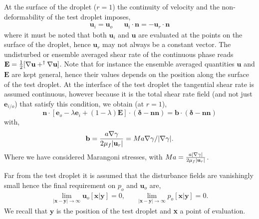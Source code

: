 At the surface of the droplet ($r = 1$) the continuity of velocity and the non-deformability of the test droplet imposes, 
\begin{align}
    \textbf{u}_{i} = \textbf{u}_{o}
    && 
    \textbf{u}_{i} \cdot \textbf{n}
    =
    - \textbf{u}_r \cdot \textbf{n}
    \label{eq:normal_vel}
\end{align}
where it must be noted that both $\textbf{u}_{i}$ and $\textbf{u}$ are evaluated at the points on the surface of the droplet, hence $\textbf{u}_r$ may not always be a constant vector. 
The undisturbed or ensemble averaged shear rate of the continuous phase reads  $\textbf{E} =\frac{1}{2} [\mathbf{\nabla} \textbf{u} + ^\dagger \mathbf{\nabla} \textbf{u}]$. 
Note that for instance the ensemble averaged quantities $\textbf{u}$ and $\textbf{E}$ are kept general, hence their values depends on the position along the surface of the test droplet. 
At the interface of the test droplet the tangential shear rate is assumed continuous, however because it is the total shear rate field (and not just $\textbf{e}_{i/o}$) that satisfy this condition, we obtain (at $r=1$),
\begin{equation}
    \mathbf{n}\cdot [\textbf{e}_{o} - \lambda \textbf{e}_{i} + (1-\lambda)\textbf{E}
    ]\cdot (\bm\delta - \textbf{nn})
    =
    \textbf{b}\cdot (\bm\delta - \textbf{nn})
    \label{eq:boundary_cdt_stress}
\end{equation}
with, 
\begin{equation}
    \textbf{b}
    =
    \frac{a \mathbf{\nabla} \gamma}{2 \mu_f |\textbf{u}_r|}
    = Ma \mathbf{\nabla}\gamma /|\mathbf{\nabla} \gamma|. 
\end{equation}
Where we have considered Marangoni stresses, with $Ma = \frac{a |\mathbf{\nabla} \gamma|}{2 \mu_f |\textbf{u}_r|}$. 



Far from the test droplet it is assumed that the disturbance fields are vanishingly small hence the final requirement on $p_{o}$ and $\textbf{u}_{o}$ are, 
\begin{align*}
    \lim_{|\textbf{x}-\textbf{y}|\to\infty }\textbf{u}_{o}[\textbf{x}|\textbf{y}] = 0,
    && \lim_{|\textbf{x}-\textbf{y}|\to\infty }p_{o}[\textbf{x}|\textbf{y}]= 0. 
\end{align*}
We recall that $\textbf{y}$ is the position of the test droplet and \textbf{x} a point of evaluation. 





